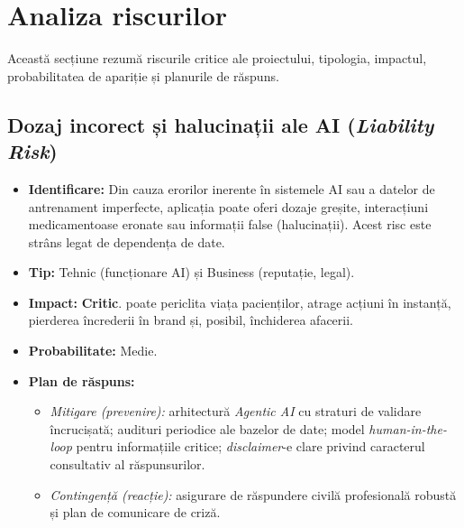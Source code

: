 \section{Analiza riscurilor}

Această secțiune rezumă riscurile critice ale proiectului, tipologia, impactul, probabilitatea de apariție și planurile de răspuns.

\subsection{Dozaj incorect și halucinații ale AI (\textit{Liability Risk})}
\begin{itemize}
    \item \textbf{Identificare:} Din cauza erorilor inerente în sistemele AI sau a datelor de antrenament imperfecte, aplicația poate oferi dozaje greșite, interacțiuni medicamentoase eronate sau informații false (halucinații). Acest risc este strâns legat de dependența de date.
    \item \textbf{Tip:} Tehnic (funcționare AI) și Business (reputație, legal).
    \item \textbf{Impact:} \textbf{Critic}. poate periclita viața pacienților, atrage acțiuni în instanță, pierderea încrederii în brand și, posibil, închiderea afacerii.
    \item \textbf{Probabilitate:} Medie.
    \item \textbf{Plan de răspuns:}
    \begin{itemize}
        \item \textit{Mitigare (prevenire):} arhitectură \textit{Agentic AI} cu straturi de validare încrucișată; audituri periodice ale bazelor de date; model \textit{human-in-the-loop} pentru informațiile critice; \textit{disclaimer}-e clare privind caracterul consultativ al răspunsurilor.
        \item \textit{Contingență (reacție):} asigurare de răspundere civilă profesională robustă și plan de comunicare de criză.
    \end{itemize}
\end{itemize}

